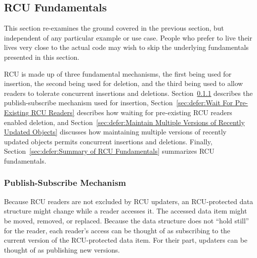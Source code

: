 
\subsection{RCU Fundamentals}
\label{sec:defer:RCU Fundamentals}

This section re-examines the ground covered in the previous section, but
independent of any particular example or use case.
People who prefer to live their lives very close to the actual code may
wish to skip the underlying fundamentals presented in this section.

RCU is made up of three fundamental mechanisms, the first being
used for insertion, the second being used for deletion, and the third
being used to allow readers to tolerate concurrent insertions and deletions.
Section~\ref{sec:defer:Publish-Subscribe Mechanism}
describes the publish-subscribe mechanism used for insertion,
Section~\ref{sec:defer:Wait For Pre-Existing RCU Readers}
describes how waiting for pre-existing RCU readers enabled deletion,
and
Section~\ref{sec:defer:Maintain Multiple Versions of Recently Updated Objects}
discusses how maintaining multiple versions of recently updated objects
permits concurrent insertions and deletions.
Finally,
Section~\ref{sec:defer:Summary of RCU Fundamentals}
summarizes RCU fundamentals.

\subsubsection{Publish-Subscribe Mechanism}
\label{sec:defer:Publish-Subscribe Mechanism}

Because RCU readers are not excluded by RCU updaters, an RCU-protected
data structure might change while a reader accesses it.
The accessed data item might be moved, removed, or replaced.
Because the data structure does not ``hold still'' for the reader,
each reader's access can be thought of as subscribing to the current
version of the RCU-protected data item.
For their part, updaters can be thought of as publishing new versions.


